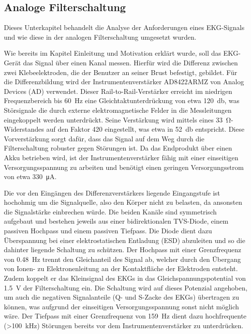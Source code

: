 
\subsection{Analoge Filterschaltung}

Dieses Unterkapitel behandelt die Analyse der Anforderungen eines EKG-Signals und wie diese in der analogen Filterschaltung umgesetzt wurden. 

Wie bereits im Kapitel Einleitung und Motivation erklärt wurde, soll das EKG-Gerät das Signal über einen Kanal messen. Hierfür wird die Differenz zwischen zwei Klebeelektroden, die der Benutzer an seiner Brust befestigt, gebildet. Für die Differenzbildung wird der Instrumentenverstärker AD8422ARMZ von Analog Devices (AD) verwendet. Dieser Rail-to-Rail-Verstärker erreicht im niedrigen Frequenzbereich bis \SI{60}{\hertz} eine Gleichtaktunterdrückung von etwa \SI{120}{\decibel}, was Störsignale die durch externe elektromagnetische Felder in die Messleitungen eingekoppelt werden unterdrückt. Seine Verstärkung wird mittels eines \SI{33}{\ohm}-Widerstandes auf den Faktor 420 eingestellt, was etwa in \SI{52}{\decibel} entspricht. Diese Vorverstärkung sorgt dafür, dass das Signal auf dem Weg durch die Filterschaltung robuster gegen Störungen ist. Da das Endprodukt über einen Akku betrieben wird, ist der Instrumentenverstärker fähig mit einer einseitigen Versorgungsspannung zu arbeiten und benötigt einen geringen Versorgungsstrom von etwa \SI{330}{\micro\ampere}. 

Die vor den Eingängen des Differenzverstärkers liegende Eingangstufe ist hochohmig um die Signalquelle, also den Körper nicht zu belasten, da ansonsten die Signalstärke einbrechen würde. Die beiden Kanäle sind symmetrisch aufgebaut und bestehen jeweils aus einer bidirektionalen TVS-Diode, einem passiven Hochpass und einem passiven Tiefpass. Die Diode dient dazu Überspannung bei einer elektrostatischen Entladung (ESD) abzuleiten und so die dahinter liegende Schaltung zu schützen. Der Hochpass mit einer Grenzfrequenz von \SI{0,48}{\hertz} trennt den Gleichanteil des Signal ab, welcher durch den Übergang von Ionen- zu Elektronenleitung an der Kontaktfläche der Elektroden entsteht. Zudem koppelt er das Kleinsignal des EKGs in das Gleichspannungspotential von \SI{1,5}{\volt} der Filterschaltung ein. Die Schaltung wird auf dieses Potenzial angehoben, um auch die negativen Signalanteile (Q- und S-Zacke des EKGs) übertragen zu können, was aufgrund der einseitigen Versorgungsspannung sonst nicht möglich wäre. Der Tiefpass mit einer Grenzfrequenz von \SI{159}{\hertz} dient dazu hochfrequente (>\SI{100}{\kilo\hertz}) Störungen bereits vor dem Instrumentenverstärker zu unterdrücken. 

